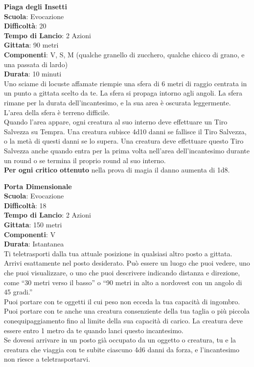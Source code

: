 \begin{multicols}{2}
\medskip\textbf{Piaga degli Insetti}\\
\textbf{Scuola}: Evocazione\\
\textbf{Difficoltà}:  20\\
\textbf{Tempo di Lancio}: 2 Azioni\\
\textbf{Gittata}: 90 metri\\
\textbf{Componenti}: V, S, M (qualche granello di zucchero, qualche chicco di grano, e una passata di lardo)\\
\textbf{Durata}: 10 minuti\\
Uno sciame di locuste affamate riempie una sfera di 6 metri di raggio centrata in un punto a gittata scelto da te. La sfera si propaga intorno agli angoli. La sfera rimane per la durata dell'incantesimo, e la sua area è oscurata leggermente. L’area della sfera è terreno difficile.\\
Quando l’area appare, ogni creatura al suo interno deve effettuare un Tiro Salvezza su Tempra. Una creatura subisce 4d10 danni se fallisce il Tiro Salvezza, o la metà di questi danni se lo supera. Una creatura deve effettuare questo Tiro Salvezza anche quando entra per la prima volta nell'area dell'incantesimo durante un round o se termina il proprio round al suo interno.\\
\textbf{Per ogni critico ottenuto} nella prova di magia il danno aumenta di 1d8.

\medskip\textbf{Porta Dimensionale}\\
\textbf{Scuola}: Evocazione\\
\textbf{Difficoltà}:  18\\
\textbf{Tempo di Lancio}: 2 Azioni\\
\textbf{Gittata}: 150 metri\\
\textbf{Componenti}: V\\
\textbf{Durata}: Istantanea\\
Ti teletrasporti dalla tua attuale posizione in qualsiasi altro posto a gittata. Arrivi esattamente nel posto desiderato. Può essere un luogo che puoi vedere, uno che puoi visualizzare, o uno che puoi descrivere indicando distanza e direzione, come “30 metri verso il basso” o “90 metri in alto a nordovest con un angolo di 45 gradi.”\\
Puoi portare con te oggetti il cui peso non ecceda la tua capacità di ingombro. Puoi portare con te anche una creatura consenziente della tua taglia o più piccola conequipaggiamento fino al limite  della sua capacità di carico. La creatura deve essere entro 1 metro da te quando lanci questo incantesimo. \\
Se dovessi arrivare in un posto già occupato da un oggetto o creatura, tu e la creatura che viaggia con te subite ciascuno 4d6 danni da forza, e l'incantesimo non riesce a teletrasportarvi.


\end{multicols}
